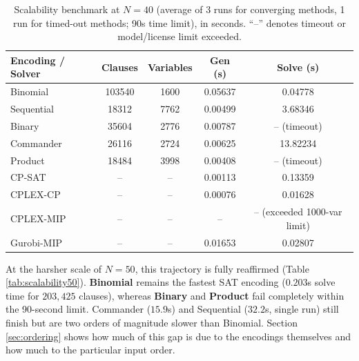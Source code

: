 \documentclass[a4paper,fleqn]{cas-sc}
\begin{document}
\begin{table}[htbp]
    \centering
    \renewcommand{\arraystretch}{1.10}
    \caption{Scalability benchmark at $N=40$ (average of 3 runs for converging methods, 1 run for timed-out methods; 90s time limit), in seconds. ``--'' denotes timeout or model/license limit exceeded.}
    \label{tab:scalability}
    \begin{tabular}{l S[table-format=6.0] S[table-format=4.0] S[table-format=1.5] S[table-format=2.5]}
        \toprule
        \textbf{Encoding / Solver} & \textbf{Clauses} & \textbf{Variables} & \textbf{Gen (s)} & \textbf{Solve (s)} \\
        \midrule
        Binomial  & 103540 & 1600 & 0.05637 & 0.04778 \\
        Sequential & 18312 & 7762 & 0.00499 & 3.68346 \\
        Binary    & 35604 & 2776 & 0.00787 & {-- (timeout)} \\
        Commander & 26116 & 2724 & 0.00625 & 13.82234 \\
        Product   & 18484 & 3998 & 0.00408 & {-- (timeout)} \\
        \midrule
        CP-SAT    & {--}     &   {--}  & 0.00113 & 0.13359 \\
        CPLEX-CP  & {--}     &   {--}  & 0.00076 & 0.01628 \\
        CPLEX-MIP & {--}     &   {--}  & {--}      & {-- (exceeded 1000-var limit)} \\
        Gurobi-MIP& {--}     &   {--}  & 0.01653 & 0.02807 \\
        \bottomrule
    \end{tabular}
\end{table}

At the harsher scale of $N=50$, this trajectory is fully reaffirmed (Table \ref{tab:scalability50}). \textbf{Binomial} remains the fastest SAT encoding ($0.203$s solve time for $203,425$ clauses), whereas \textbf{Binary} and \textbf{Product} fail completely within the 90-second limit. Commander ($15.9$s) and Sequential ($32.2$s, single run) still finish but are two orders of magnitude slower than Binomial. Section \ref{sec:ordering} shows how much of this gap is due to the encodings themselves and how much to the particular input order.
\end{document}
